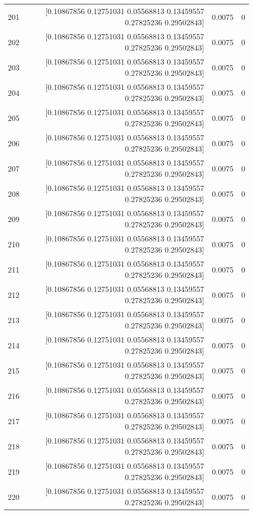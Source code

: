 \begin{longtable}{lrrr}
201 & [0.10867856 0.12751031 0.05568813 0.13459557 0.27825236 0.29502843] & 0.0075 & 0 \\
202 & [0.10867856 0.12751031 0.05568813 0.13459557 0.27825236 0.29502843] & 0.0075 & 0 \\
203 & [0.10867856 0.12751031 0.05568813 0.13459557 0.27825236 0.29502843] & 0.0075 & 0 \\
204 & [0.10867856 0.12751031 0.05568813 0.13459557 0.27825236 0.29502843] & 0.0075 & 0 \\
205 & [0.10867856 0.12751031 0.05568813 0.13459557 0.27825236 0.29502843] & 0.0075 & 0 \\
206 & [0.10867856 0.12751031 0.05568813 0.13459557 0.27825236 0.29502843] & 0.0075 & 0 \\
207 & [0.10867856 0.12751031 0.05568813 0.13459557 0.27825236 0.29502843] & 0.0075 & 0 \\
208 & [0.10867856 0.12751031 0.05568813 0.13459557 0.27825236 0.29502843] & 0.0075 & 0 \\
209 & [0.10867856 0.12751031 0.05568813 0.13459557 0.27825236 0.29502843] & 0.0075 & 0 \\
210 & [0.10867856 0.12751031 0.05568813 0.13459557 0.27825236 0.29502843] & 0.0075 & 0 \\
211 & [0.10867856 0.12751031 0.05568813 0.13459557 0.27825236 0.29502843] & 0.0075 & 0 \\
212 & [0.10867856 0.12751031 0.05568813 0.13459557 0.27825236 0.29502843] & 0.0075 & 0 \\
213 & [0.10867856 0.12751031 0.05568813 0.13459557 0.27825236 0.29502843] & 0.0075 & 0 \\
214 & [0.10867856 0.12751031 0.05568813 0.13459557 0.27825236 0.29502843] & 0.0075 & 0 \\
215 & [0.10867856 0.12751031 0.05568813 0.13459557 0.27825236 0.29502843] & 0.0075 & 0 \\
216 & [0.10867856 0.12751031 0.05568813 0.13459557 0.27825236 0.29502843] & 0.0075 & 0 \\
217 & [0.10867856 0.12751031 0.05568813 0.13459557 0.27825236 0.29502843] & 0.0075 & 0 \\
218 & [0.10867856 0.12751031 0.05568813 0.13459557 0.27825236 0.29502843] & 0.0075 & 0 \\
219 & [0.10867856 0.12751031 0.05568813 0.13459557 0.27825236 0.29502843] & 0.0075 & 0 \\
220 & [0.10867856 0.12751031 0.05568813 0.13459557 0.27825236 0.29502843] & 0.0075 & 0 \\

\end{longtable}
